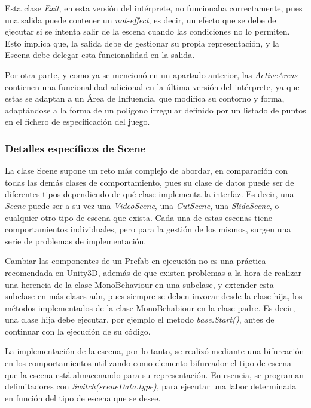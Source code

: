 Esta clase \textit{Exit}, en esta versión del intérprete, no funcionaba correctamente, pues una salida puede contener un \textit{not-effect}, es decir, un efecto que se debe de ejecutar si se intenta salir de la escena cuando las condiciones no lo permiten. Esto implica que, la salida debe de gestionar su propia representación, y la Escena debe delegar esta funcionalidad en la salida.

Por otra parte, y como ya se mencionó en un apartado anterior, las \textit{ActiveAreas} contienen una funcionalidad adicional en la última versión del intérprete, ya que estas se adaptan a un Área de Influencia, que modifica su contorno y forma, adaptándose a la forma de un polígono irregular definido por un listado de puntos en el fichero de especificación del juego.

\subsubsection{Detalles específicos de Scene}

La clase Scene supone un reto más complejo de abordar, en comparación con todas las demás clases de comportamiento, pues su clase de datos puede ser de diferentes tipos dependiendo de qué clase implementa la interfaz. Es decir, una \textit{Scene} puede ser a su vez una \textit{VideoScene}, una \textit{CutScene}, una \textit{SlideScene}, o cualquier otro tipo de escena que exista. Cada una de estas escenas tiene comportamientos individuales, pero para la gestión de los mismos, surgen una serie de problemas de implementación.

Cambiar las componentes de un Prefab en ejecución no es una práctica recomendada en Unity3D, además de que existen problemas a la hora de realizar una herencia de la clase MonoBehaviour en una subclase, y extender esta subclase en más clases aún, pues siempre se deben invocar desde la clase hija, los métodos implementados de la clase MonoBehabiour en la clase padre. Es decir, una clase hija debe ejecutar, por ejemplo el metodo \textit{base.Start()}, antes de continuar con la ejecución de su código.

La implementación de la escena, por lo tanto, se realizó mediante una bifurcación en los comportamientos utilizando como elemento bifurcador el tipo de escena que la escena está almacenando para su representación. En esencia, se programan delimitadores con \textit{Switch(sceneData.type)}, para ejecutar una labor determinada en función del tipo de escena que se desee.

